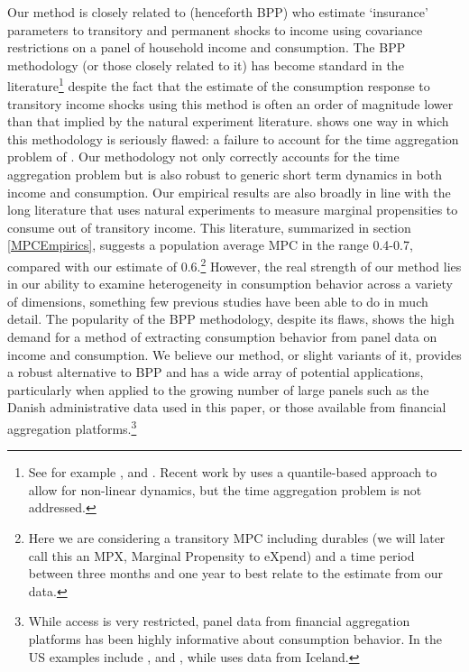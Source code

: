 \documentclass[titlepage]{\econtex}\newcommand{\texname}{ConsumptionHeterogeneity}
\begin{document}
Our method is closely related to \cite{blundell_consumption_2008} (henceforth BPP) who estimate `insurance' parameters to transitory and permanent shocks to income using covariance restrictions on a panel of household income and consumption. The BPP methodology (or those closely related to it) has become standard in the literature\footnote{See for example \cite{violante_wealthy_2014}, \cite{auclert_monetary_2017} and \cite{manovskii_how_2017}. Recent work by \cite{arellano_earnings_2017} uses a quantile-based approach to allow for non-linear dynamics, but the time aggregation problem is not addressed.} despite the fact that the estimate of the consumption response to transitory income shocks using this method is often an order of magnitude lower than that implied by the natural experiment literature. \cite{crawley_time_2018} shows one way in which this methodology is seriously flawed: a failure to account for the time aggregation problem of \cite{working_note_1960}. Our methodology not only correctly accounts for the time aggregation problem but is also robust to generic short term dynamics in both income and consumption. Our empirical results are also broadly in line with the long literature that uses natural experiments to measure marginal propensities to consume out of transitory income. This literature, summarized in section \ref{MPCEmpirics}, suggests a population average MPC in the range 0.4-0.7, compared with our estimate of 0.6.\footnote{Here we are considering a transitory MPC including durables (we will later call this an MPX, Marginal Propensity to eXpend) and a time period between three months and one year to best relate to the estimate from our data.} However, the real strength of our method lies in our ability to examine heterogeneity in consumption behavior across a variety of dimensions, something few previous studies have been able to do in much detail. The popularity of the BPP methodology, despite its flaws, shows the high demand for a method of extracting consumption behavior from panel data on income and consumption. We believe our method, or slight variants of it, provides a robust alternative to BPP and has a wide array of potential applications, particularly when applied to the growing number of large panels such as the Danish administrative data used in this paper, or those available from financial aggregation platforms.\footnote{While access is very restricted, panel data from financial aggregation platforms has been highly informative about consumption behavior. In the US examples include \cite{gelman_harnessing_2014}, \cite{ganong_consumer_2017} and \cite{baker_debt_2015}, while \cite{vardardottir_liquid_2016} uses data from Iceland.}
\end{document}
